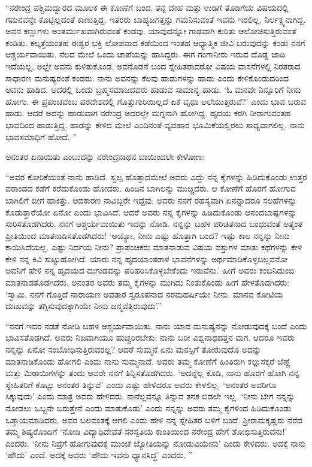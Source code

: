 “ನರೇಂದ್ರ ಪಶ್ಚಿಮದ್ವಾರದ ಮೂಲಕ ಈ ಕೋಣೆಗೆ ಬಂದ. ತನ್ನ ದೇಹ ಮತ್ತು ಉಡಿಗೆ ತೊಡಿಗೆಯ ವಿಷಯದಲ್ಲಿ ಗಮನವನ್ನೇ ಕೊಟ್ಟಿಲ್ಲದಂತೆ ಕಾಣುತ್ತಿದ್ದ. ಇತರರು ಬಾಹ್ಯಜಗತ್ತನ್ನು ಗಮನಿಸುವಂತೆ ಇವನು ಇರಲಿಲ್ಲ, ನಿರ್ಲಕ್ಷ್ಯನಾಗಿದ್ದ. ಅವನ ಕಣ್ಣುಗಳು ಅಂತರ್ಮುಖವಾಗಿರುವಂತೆ ಕಂಡವು. ಯಾವುದನ್ನೋ ಗಾಢವಾಗಿ ಕುರಿತು ಆಲೋಚಿಸುತ್ತಿರುವಂತೆ ಕಂಡಿತು. ಕಲ್ಕತ್ತೆಯಂತಹ ಈಶ್ವರ ಭಕ್ತಿ ಲೋಪವಾದ ಕಡೆಯಿಂದ ಇಂತಹ ಆಧ್ಯಾತ್ಮಿಕ ಜೀವಿ ಬರುವುದನ್ನು ಕಂಡು ನನಗೆ ಆಶ್ಚರ್ಯವಾಯಿತು. ನೆಲದ ಮೇಲೆ ಒಂದು ಚಾಪೆಯನ್ನು ಹಾಸಿದ್ದರು. ಈಗ ಗಂಗಾನೀರು ಇರುವ ದೊಡ್ಡ ಜಾಡಿ ಇದೆಯಲ್ಲ, ಅಲ್ಲೇ ಅವನು ಕುಳಿತುಕೊಂಡ. ಅವನೊಡನೆ ಬಂದ ಸ್ನೇಹಿತರಾದರೋ ವಿಷಯ ವಾಸನೆಗಳಲ್ಲಿ ನಿರತರಾದ ಸಾಧಾರಣ ಮನುಷ್ಯರಂತೆ ಕಂಡರು. ನಾನು ಅವನನ್ನು ಕೆಲವು ಹಾಡುಗಳನ್ನು ಹಾಡು ಎಂದು ಕೇಳಿಕೊಂಡುದರಿಂದ ಅವನು ಹಾಡಿದ. ಅದರಲ್ಲಿ ಒಂದು ಬ್ರಹ್ಮಸಮಾಜದವರು ಹಾಡುವ ಸಾಮಾನ್ಯ ಹಾಡು. ‘ಓ ಮನವೇ ನಿನ್ನೂರಿಗೆ ನೀನು ಹೋಗು. ಈ ಪ್ರಪಂಚವೆಂಬ ಪರದೇಶದಲ್ಲಿ ಗೊತ್ತುಗುರಿಯಿಲ್ಲದೆ ಏಕೆ ವೃಥಾ ಅಲೆಯುತ್ತಿರುವೆ?’ ಎಂದು ಭಾವ ಬರುವ ಹಾಡು. ಆದರೆ ಅದನ್ನು ಹಾಡುವಾಗ ನರೇಂದ್ರ ಅದರಲ್ಲೇ ಮಗ್ನನಾಗಿ ಹೋಗಿದ್ದ. ಹೃದಯ ಕರಗಿ ನೀರಾಗುವಂತಹ ಭಾವದಿಂದ ಹಾಡುತ್ತಿದ್ದ. ಹಾಡನ್ನು ಕೇಳಿದ ಮೇಲೆ ಎಂದಿನಂತೆ ವ್ಯವಹಾರ ಭೂಮಿಕೆಯಲ್ಲಿರಲು ಸಾಧ್ಯವಾಗಲಿಲ್ಲ. ನಾನು ಭಾವಸಮಾಧಿಗೆ ಹೋದೆ. ”

ಅನಂತರ ಏನಾಯಿತು ಎಂಬುದನ್ನು ನರೇಂದ್ರನಾಥನ ಬಾಯಿಂದಲೇ ಕೇಳೋಣ:

“ಅವರ ಕೋರಿಕೆಯಂತೆ ನಾನು ಹಾಡಿದೆ. ಸ್ವಲ್ಪ ಹೊತ್ತಾದಮೇಲೆ ಅವರು ಎದ್ದು ನನ್ನ ಕೈಗಳನ್ನು ಹಿಡಿದುಕೊಂಡು ಉತ್ತರ ವರಾಂಡದ ಕಡೆಗೆ ಕರೆದುಕೊಂಡು ಹೋದರು. ಹಿಂದಿನ ಬಾಗಿಲನ್ನು ಮುಚ್ಚಿದರು. ಆ ಕೋಣೆಗೆ ಹೊರಗೆ ಹೋಗುವ ಬಾಗಿಲಿಗೆ ಬೀಗ ಹಾಕಿತ್ತು. ಆದಕಾರಣ ನಾವಿಬ್ಬರೇ ಇದ್ದೆವು. ಅವರು ನನಗೆ ರಹಸ್ಯವಾಗಿ ಏನನ್ನಾದರೂ ಸಲಹೆಗಳನ್ನು ಕೊಡುತ್ತಾರೆಯೋ ಏನೋ ಎಂದು ಭಾವಿಸಿದೆ. ಆದರೆ ಅವರು ನನ್ನ ಕೈಗಳನ್ನು ಹಿಡಿದುಕೊಂಡು ಆನಂದಬಾಷ್ಪಗಳನ್ನು ಸುರಿಸತೊಡಗಿದರು. ನನಗೆ ಆಶ್ಚರ್ಯವಾಯಿತು ಇದನ್ನು ನೋಡಿ. ನನ್ನನ್ನು ಬಹಳ ಪರಿಚಿತನಾದ ಬಂಧುವಂತೆ ಅತ್ಯಂತ ಪ್ರೀತಿಯಿಂದ ಮಾತನಾಡಿಸತೊಡಗಿದರು! ‘ಅಯ್ಯೋ, ನೀನು ಎಷ್ಟು ಹೊತ್ತಾಗಿ ಬಂದೆ? ಇಷ್ಟು ಕಾಲ ನನ್ನನ್ನು ನೀನು ಕಾಯಿಸಿದೆಯಲ್ಲ. ಎಷ್ಟು ನಿರ್ದಯ ನೀನು? ಪ್ರಾಪಂಚಿಕರು ಮಾತನಾಡುವ ವಿಷಯ ವಸ್ತುಗಳ ಮಾತು ಕಥೆಗಳನ್ನು ಕೇಳಿ ಕೇಳಿ ನನ್ನ ಕಿವಿ ಸುಟ್ಟುಹೋಗಿದೆ. ಯಾರು ನನ್ನ ಹೃದಯಾಂತರಾಳ ಭಾವನೆಗಳನ್ನು ಅರ್ಥಮಾಡಿಕೊಳ್ಳಬಲ್ಲವನೋ ಅವನಿಗೆ ಹೇಳಿ ನನ್ನ ಹೃದಯದ ದುಗುಡವನ್ನು ಪರಿಹರಿಸಿಕೊಳ್ಳಬೇಕೆಂದು ಇರುವೆನು.’ ಹೀಗೆ ಅವರು ಕಂಬನಿದುಂಬಿ ಮಾತನಾಡತೊಡಗಿದರು. ಅನಂತರ ಅವರು ತಮ್ಮ ಕೈಗಳನ್ನು ಮುಗಿದು ನಿಂತುಕೊಂಡು ಹೀಗೆ ಹೇಳತೊಡಗಿದರು: ‘ಸ್ವಾಮಿ, ನನಗೆ ಗೊತ್ತಿದೆ ನಾರಾಯಣ ಅವತಾರ ಸ್ವರೂಪನಾದ ನರಮಹರ್ಷಿಯೇ ನೀನು. ಮಾನವ ಕೋಟಿಯ ದುಃಖವನ್ನು ತಗ್ಗಿಸುವುದಕ್ಕಾಗಿಯೇ ನೀನು ಜನ್ಮವೆತ್ತಿರುವುದು’.”

“ನನಗೆ ಇವರ ನಡತೆ ನೋಡಿ ಬಹಳ ಆಶ್ಚರ್ಯವಾಯಿತು. ನಾನು ಯಾವ ಮನುಷ್ಯನನ್ನು ನೋಡುವುದಕ್ಕೆ ಬಂದೆ ಎಂದು ಭಾವಿಸತೊಡಗಿದೆ. ಅವರು ನಿಜವಾಗಿಯೂ ಹುಚ್ಚರಿರಬೇಕು; ನಾನು ಬರೀ ವಿಶ್ವನಾಥದತ್ತನ ಮಗ. ಆದರೂ ಇವರು ನನ್ನನ್ನು ಏನೋ ಸಂಬೋಧಿಸುತ್ತಿರುವರಲ್ಲ? ಆದರೆ ಸುಮ್ಮನೆ ಏನು ಮನಸ್ಸಿಗೆ ತೋರುವುದೊ ಅದನ್ನು ಮಾತನಾಡಿಕೊಂಡು ಹೋಗಲಿ ಎಂದು ನಾನು ಸುಮ್ಮನಾದೆ. ಅವರು ತಮ್ಮ ಕೋಣೆಗೆ ಹಿಂತಿರುಗಿ ಕಲ್ಲುಸಕ್ಕರೆ ಬೆಣ್ಣೆ ಮತ್ತು ಮಿಠಾಯಿಗಳನ್ನು ತಂದು ಅವರೇ ನನಗೆ ತಿನ್ನಿಸತೊಡಗಿದರು. ‘ಅದನ್ನೆಲ್ಲ ಕೊಡಿ, ನಾನು ಹೊರಗೆ ಹೋಗಿ ನನ್ನ ಸ್ನೇಹಿತರಿಗೆ ಕೊಟ್ಟು ಅನಂತರ ತಿನ್ನುವೆ’ ಎಂದು ಎಷ್ಟು ಹೇಳಿದರೂ ಅವರು ಕೇಳಲಿಲ್ಲ. ‘ಅನಂತರ ಅವರಿಗೂ ಸಿಕ್ಕುವುದು’ ಎಂದು ಮಾತ್ರ ಅವರು ಹೇಳಿದರು. ನಾನೆಲ್ಲವನ್ನೂ ತಿನ್ನುವ ತನಕ ಬಿಡಲೇ ಇಲ್ಲ. ‘ನೀನು ಬೇಗ ನನ್ನನ್ನು ನೋಡಲು ಒಬ್ಬನೇ ಬರುತ್ತೇನೆ ಎಂದು ಮಾತುಕೊಡು’ ಎಂದು ನನ್ನನ್ನು ಅವರು ತಮ್ಮ ಕೈಗಳಿಂದ ಹಿಡಿದುಕೊಂಡು ಒತ್ತಾಯಮಾಡಿದರು. ಅವರ ಬಲವಂತಕ್ಕೆ ಆಗಲಿ ಎಂದು ಹೇಳಿ ನನ್ನ ಸ್ನೇಹಿತರ ಬಳಿಗೆ ಬಂದೆ. ಶ‍್ರೀರಾಮಕೃಷ್ಣರು ನೆರೆದ ತಮ್ಮ ಶಿಷ್ಯರೊಂದಿಗೆ ‘ನೋಡಿ ವಿದ್ಯಾಧಿದೇವತೆ ಸರಸ್ವತಿಯ ಕಾಂತಿಯಿಂದ ನರೇಂದ್ರ ಹೇಗೆ ಶೋಭಿಸುತ್ತಿರುವನು!’ ಎಂದರು. ‘ನೀನು ನಿದ್ರೆಗೆ ಹೋಗುವುದಕ್ಕೆ ಮುಂಚೆ ಜ್ಯೋತಿಯನ್ನು ನೋಡುವಿಯೇನು’ ಎಂದು ಕೇಳಿದರು. ಅದಕ್ಕೆ ನಾನು ‘ಹೌದು’ ಎಂದೆ. ಅದಕ್ಕೆ ಅವರು ‘ಹೌದು ಇವನು ಧ್ಯಾನಸಿದ್ಧ’ ಎಂದರು. ”

